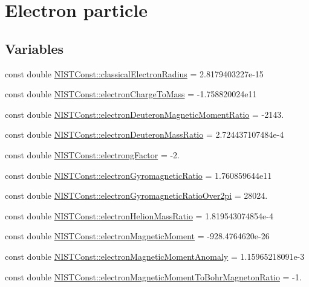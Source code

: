 \hypertarget{group___electron}{}\section{Electron particle}
\label{group___electron}
\subsection*{Variables}
\begin{DoxyCompactItemize}
\item 
const double \hyperlink{group___electron_gac67d6a01d8d75cb66290a36f7123942b}{N\+I\+S\+T\+Const\+::classical\+Electron\+Radius} = 2.\+8179403227e-\/15
\item 
const double \hyperlink{group___electron_ga941e6299b6ef4b90cc525c335d9989dc}{N\+I\+S\+T\+Const\+::electron\+Charge\+To\+Mass} = -\/1.\+758820024e11
\item 
const double \hyperlink{group___electron_ga3dea53b57010903586a46d81a49fc80f}{N\+I\+S\+T\+Const\+::electron\+Deuteron\+Magnetic\+Moment\+Ratio} = -\/2143.
\item 
const double \hyperlink{group___electron_gad526d455579237804ce6194b50782c0e}{N\+I\+S\+T\+Const\+::electron\+Deuteron\+Mass\+Ratio} = 2.\+724437107484e-\/4
\item 
const double \hyperlink{group___electron_ga65a20f263f8ef8f324ea6d1879050a66}{N\+I\+S\+T\+Const\+::electrong\+Factor} = -\/2.
\item 
const double \hyperlink{group___electron_ga7c738b9078ca0308ee45d3b8bbafadb6}{N\+I\+S\+T\+Const\+::electron\+Gyromagnetic\+Ratio} = 1.\+760859644e11
\item 
const double \hyperlink{group___electron_ga67e6ebbd2c2d8043cbdb09979dc7247b}{N\+I\+S\+T\+Const\+::electron\+Gyromagnetic\+Ratio\+Over2pi} = 28024.
\item 
const double \hyperlink{group___electron_ga5039598cd8a51d15d9dfbb0463c109d6}{N\+I\+S\+T\+Const\+::electron\+Helion\+Mass\+Ratio} = 1.\+819543074854e-\/4
\item 
const double \hyperlink{group___electron_ga81fc83bd665b7b4fb83e9901ed7d6628}{N\+I\+S\+T\+Const\+::electron\+Magnetic\+Moment} = -\/928.\+4764620e-\/26
\item 
const double \hyperlink{group___electron_gaf1a0633191464e7a695240858b9b407c}{N\+I\+S\+T\+Const\+::electron\+Magnetic\+Moment\+Anomaly} = 1.\+15965218091e-\/3
\item 
const double \hyperlink{group___electron_ga921889f482e157189bf19818e428532f}{N\+I\+S\+T\+Const\+::electron\+Magnetic\+Moment\+To\+Bohr\+Magneton\+Ratio} = -\/1.

\end{DoxyCompactItemize}
